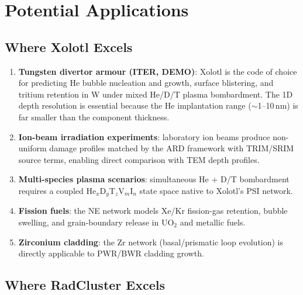 \documentclass[12pt,letterpaper]{article}
\begin{document}
\section{Potential Applications}
\label{sec:applications}

\subsection{Where Xolotl Excels}

\begin{enumerate}
  \item \textbf{Tungsten divertor armour (ITER, DEMO)}: Xolotl is the
    code of choice for predicting He bubble nucleation and growth,
    surface blistering, and tritium retention in W under mixed He/D/T
    plasma bombardment.  The 1D depth resolution is essential because
    the He implantation range ($\sim$1--10\,nm) is far smaller than the
    component thickness.

  \item \textbf{Ion-beam irradiation experiments}: laboratory ion beams
    produce non-uniform damage profiles matched by the ARD framework
    with TRIM/SRIM source terms, enabling direct comparison with
    TEM depth profiles.

  \item \textbf{Multi-species plasma scenarios}: simultaneous He + D/T
    bombardment requires a coupled He$_x$D$_y$T$_z$V$_m$I$_n$ state
    space native to Xolotl's PSI network.

  \item \textbf{Fission fuels}: the NE network models Xe/Kr fission-gas
    retention, bubble swelling, and grain-boundary release in UO$_2$
    and metallic fuels.

  \item \textbf{Zirconium cladding}: the Zr network (basal/prismatic
    loop evolution) is directly applicable to PWR/BWR cladding growth.
\end{enumerate}

\subsection{Where RadCluster Excels}
\end{document}
